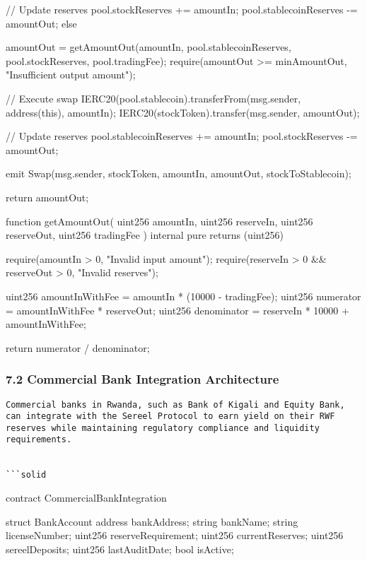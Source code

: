 \documentclass[12pt]{article}
\begin{document}
{{{{            // Update reserves            pool.stockReserves += amountIn;            pool.stablecoinReserves -= amountOut;        } else {            amountOut = getAmountOut(amountIn, pool.stablecoinReserves, pool.stockReserves, pool.tradingFee);            require(amountOut >= minAmountOut, "Insufficient output amount");

            // Execute swap            IERC20(pool.stablecoin).transferFrom(msg.sender, address(this), amountIn);            IERC20(stockToken).transfer(msg.sender, amountOut);

            // Update reserves            pool.stablecoinReserves += amountIn;            pool.stockReserves -= amountOut;        }

        emit Swap(msg.sender, stockToken, amountIn, amountOut, stockToStablecoin);

        return amountOut;    }

    function getAmountOut(        uint256 amountIn,        uint256 reserveIn,        uint256 reserveOut,        uint256 tradingFee    ) internal pure returns (uint256) {        require(amountIn > 0, "Invalid input amount");        require(reserveIn > 0 && reserveOut > 0, "Invalid reserves");

        uint256 amountInWithFee = amountIn * (10000 - tradingFee);        uint256 numerator = amountInWithFee * reserveOut;        uint256 denominator = reserveIn * 10000 + amountInWithFee;

        return numerator / denominator;    }}
\subsubsection{7.2 Commercial Bank Integration Architecture} %

\begin{lstlisting}
Commercial banks in Rwanda, such as Bank of Kigali and Equity Bank, can integrate with the Sereel Protocol to earn yield on their RWF reserves while maintaining regulatory compliance and liquidity requirements.


```solid
\end{lstlisting}
contract CommercialBankIntegration {    struct BankAccount {        address bankAddress;        string bankName;        string licenseNumber;        uint256 reserveRequirement;        uint256 currentReserves;        uint256 sereelDeposits;        uint256 lastAuditDate;        bool isActive;    }

}}
\end{document}
